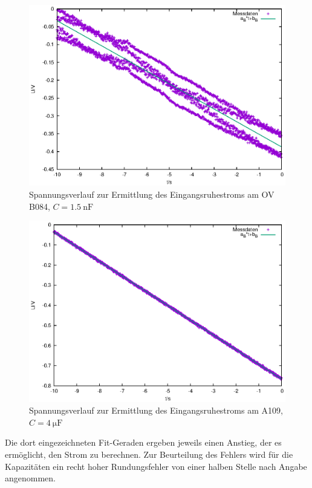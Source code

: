 \documentclass[10pt,a4paper]{scrartcl}
\begin{document}
\begin{figure}[!ht]
    \includegraphics[width=\textwidth]{graphics/fit_Eingangsruhestrom_OVB084.eps}
    \caption{Spannungsverlauf zur Ermittlung des Eingangsruhestroms am
    OV B084, $C=1.5~\mathrm{nF}$}
    \label{fig:ERS_B}
\end{figure}
\begin{figure}[!ht]
    \includegraphics[width=\textwidth]{graphics/fit_Eingangsruhestrom_A109.eps}
    \caption{Spannungsverlauf zur Ermittlung des Eingangsruhestroms am A109,
    $C=4~\mathrm{\mu F}$}
    \label{fig:ERS_A}
\end{figure}

Die dort eingezeichneten Fit-Geraden ergeben jeweils einen Anstieg,
der es ermöglicht, den Strom zu berechnen.
Zur Beurteilung des Fehlers wird für die Kapazitäten ein
recht hoher Rundungsfehler von einer halben Stelle nach Angabe angenommen.
\end{document}
